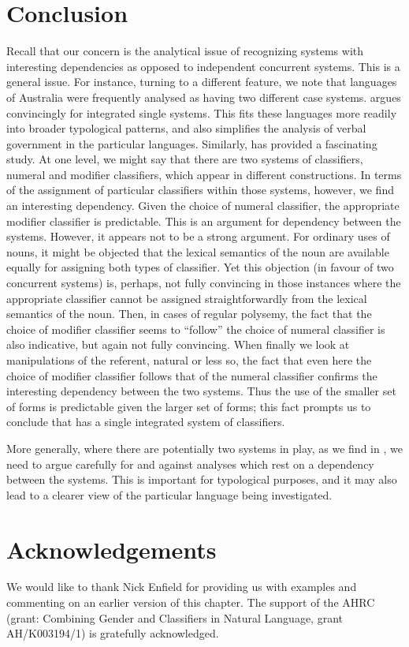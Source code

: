 \documentclass[output=paper]{langsci/langscibook}
\begin{document}
\section{Conclusion}
\largerpage
Recall that our concern is the analytical issue of recognizing systems with interesting dependencies as opposed to independent concurrent systems. This is a general issue. For instance, turning to a different feature, we note that languages of Australia  were frequently analysed as having two different case systems. \citet{Goddard1982} argues convincingly for integrated single systems. This fits these languages more readily into broader typological  patterns, and also simplifies the analysis of verbal government in the particular languages. Similarly,  has provided a fascinating study. At one level, we might say that there are two systems of classifiers, numeral and modifier classifiers, which appear in different constructions. In terms of the assignment of particular classifiers within those systems, however, we find an interesting dependency. Given the choice of numeral classifier, the appropriate modifier classifier is predictable. This is an argument for dependency between the systems. However, it appears not to be a strong argument. For ordinary uses of nouns, it might be objected that the lexical semantics of the noun are available equally for assigning both types of classifier. Yet this objection (in favour of two concurrent systems) is, perhaps, not fully convincing in those instances where the appropriate classifier cannot be assigned straightforwardly from the lexical semantics of the noun. Then, in cases of regular polysemy,  the fact that the choice of modifier classifier seems to “follow” the choice of numeral classifier is also indicative, but again not fully convincing. When finally we look at manipulations of the referent, natural or less so, the fact that even here the choice of modifier classifier follows that of the numeral classifier confirms the interesting dependency between the two systems. Thus the use of the smaller set of forms is predictable given the larger set of forms; this fact prompts us to conclude that  has a single integrated system of classifiers. 

More generally, where there are potentially two systems in play, as we find in , we need to argue carefully for and against analyses which rest on a dependency between the systems. This is important for typological purposes, and it may also lead to a clearer view of the particular language being investigated. 

\section*{Acknowledgements} 
We would like to thank Nick Enfield for providing us with examples and commenting on an earlier version of this chapter. The support of the AHRC (grant: Combining Gender and Classifiers in Natural Language, grant AH/K003194/1) is gratefully acknowledged.

{\sloppy
\printbibliography[heading=subbibliography,notkeyword=this]
}
\end{document}
